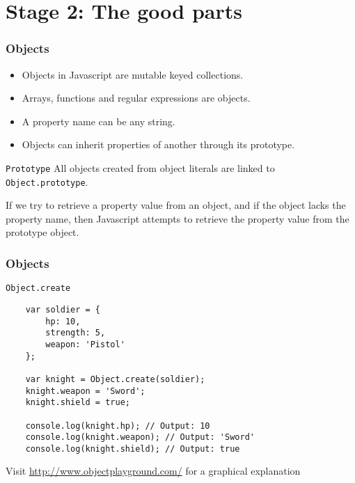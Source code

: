 \section{Stage 2: The good parts}

\begin{frame}[fragile]
\end{frame}

\begin{frame}[fragile]
  \frametitle{Objects}
  \begin{itemize}
    \item Objects in Javascript are mutable keyed collections.
    \pause\item Arrays, functions and regular expressions are objects.
    \pause\item A property name can be any string.
    \pause\item Objects can inherit properties of another through its prototype.
  \end{itemize}

  \pause

  \begin{block}{\texttt{Prototype}}
    All objects created from object literals are linked to \texttt{Object.prototype}.
    \pause

    If we try to retrieve a property value from an object, and if the object lacks the property name, then Javascript attempts to retrieve the property value from the prototype object.
  \end{block}
\end{frame}

\begin{frame}[fragile]
  \frametitle{Objects}
  \begin{block}{\texttt{Object.create}}
    {\scriptsize
    \begin{verbatim}
    var soldier = {
        hp: 10,
        strength: 5,
        weapon: 'Pistol'
    };

    var knight = Object.create(soldier);
    knight.weapon = 'Sword';
    knight.shield = true;

    console.log(knight.hp); // Output: 10
    console.log(knight.weapon); // Output: 'Sword'
    console.log(knight.shield); // Output: true
    \end{verbatim}
    }
  \end{block}

  Visit \url{http://www.objectplayground.com/} for a graphical explanation
\end{frame}

